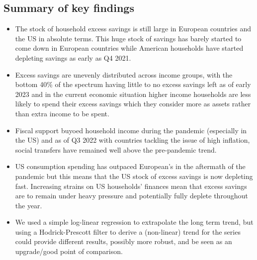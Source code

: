 \subsection{Summary of key findings}
\begin{itemize}
    \item The stock of household excess savings is still large in European countries and the US in absolute terms. This huge stock of savings has barely started to come down in European countries while American households have started depleting savings as early as Q4 2021. 
    \item Excess savings are unevenly distributed across income groups, with the bottom 40\% of the spectrum having little to no excess savings left as of early 2023 and in the current economic situation higher income households are less likely to spend their excess savings which they consider more as assets rather than extra income to be spent.
    \item Fiscal support buyoed household income during the pandemic (especially in the US) and as of Q3 2022 with countries tackling the issue of high inflation, social transfers have remained well above the pre-pandemic trend.
    \item US consumption spending has outpaced European’s in the aftermath of the pandemic but this means that the US stock of excess savings is now depleting fast. Increasing strains on US households’ finances mean that excess savings are to remain under heavy pressure and potentially fully deplete throughout the year.
    \item We used a simple log-linear regression to extrapolate the long term trend, but using a Hodrick-Prescott filter to derive a (non-linear) trend for the series could provide different results, possibly more robust, and be seen as an upgrade/good point of comparison.
\end{itemize}